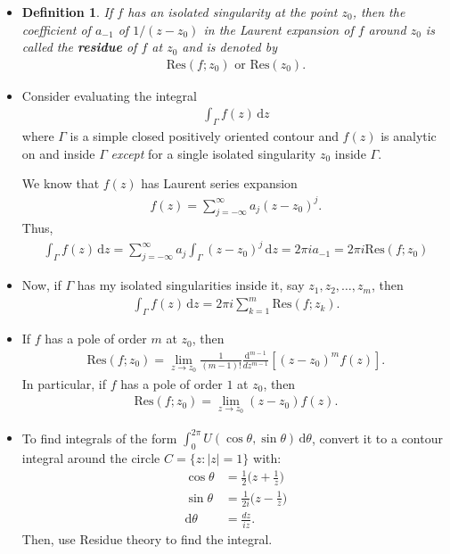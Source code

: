 \documentclass[10pt]{article}
\newtheorem{definition}[lemma]{Definition}
\newcommand{\dee}{\mathrm{d}}
\newcommand{\ra}{\rightarrow}
\newcommand{\Res}{\mathrm{Res}}
\begin{document}
  \begin{itemize}
    \item \begin{definition}
      If $f$ has an isolated singularity at the point $z_0$, then the coefficient of $a_{-1}$ of $1/(z-z_0)$ in the Laurent expansion of $f$ around $z_0$ is called the {\bf residue} of $f$ at $z_0$ and is denoted by
      \begin{align*}
        \Res(f;z_0)\mbox{ or }\Res(z_0).
      \end{align*}
    \end{definition}

    \item Consider evaluating the integral
    \begin{align*}
      \int_\Gamma f(z)\, \dee z
    \end{align*}
    where $\Gamma$ is a simple closed positively oriented contour and $f(z)$ is analytic on and inside $\Gamma$ \emph{except} for a single isolated singularity $z_0$ inside $\Gamma$.

    We know that $f(z)$ has Laurent series expansion
    \begin{align*}
      f(z) = \sum_{j=-\infty}^\infty a_j(z-z_0)^j.
    \end{align*}
    Thus,
    \begin{align*}
      \int_\Gamma f(z)\, \dee z = \sum_{j=-\infty}^\infty a_j \int_\Gamma (z-z_0)^j\, \dee z
      = 2\pi i a_{-1} = 2\pi i \Res(f;z_0)
    \end{align*}

    \item Now, if $\Gamma$ has my isolated singularities inside it, say $z_1, z_2, \dotsc, z_m$, then
    \begin{align*}
      \int_\Gamma f(z)\, \dee z = 2\pi i\sum_{k=1}^m \Res(f; z_k).
    \end{align*}

    \item If $f$ has a pole of order $m$ at $z_0$, then
    \begin{align*}
      \Res(f;z_0) = \lim_{z \ra z_0} \frac{1}{(m-1)!} \frac{\dee^{m-1}}{dz^{m-1}} [(z-z_0)^m f(z)].
    \end{align*}
    In particular, if $f$ has a pole of order $1$ at $z_0$, then
    \begin{align*}
      \Res(f;z_0) = \lim_{z \ra z_0} (z-z_0)f(z).
    \end{align*}

    \item To find integrals of the form $\int_{0}^{2\pi} U(\cos\theta, \sin\theta)\, \dee \theta$, convert it to a contour integral around the circle $C = \{z: |z| = 1\}$ with:
    \begin{align*}
      \cos \theta &= \frac{1}{2}\bigg( z + \frac{1}{z} \bigg)\\
      \sin \theta &= \frac{1}{2i}\bigg( z - \frac{1}{z} \bigg)\\
      \dee\theta &= \frac{dz}{iz}.
    \end{align*}
    Then, use Residue theory to find the integral.


\end{itemize}
\end{document}
